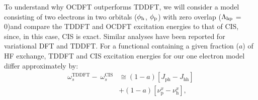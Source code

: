 \documentclass[12pt]{article}
\begin{document}
To understand why OCDFT outperforms TDDFT, we will consider a model consisting of two electrons in two orbitals ($\phi_{\rm h}$, $\phi_{\rm p}$) with zero overlap ($\Lambda_{\rm hp}$ = 0)and compare the TDDFT and OCDFT excitation energies to that of CIS, since, in this case, CIS is exact. Similar analyses have been reported for variational DFT \cite{ziegler_implementation_2012} and TDDFT. \cite{casida_charge-transfer_2000} For a functional containing a given fraction ($a$) of HF exchange, TDDFT and CIS excitation energies for our one electron model differ approximately by:
\begin{align}
\label{eq:TDDFT_CIS}
 \nonumber \omega^{\text{TDDFT}}_s - \ \omega^{\text{CIS}}_s &\cong (1 - a) [J_{\text{ph}} - J_{\text{hh}}] \\ &+ (1 - a) [\nu_{\text{p}}^x - \nu_{\text{h}}^x] ,
\end{align}
\end{document}
